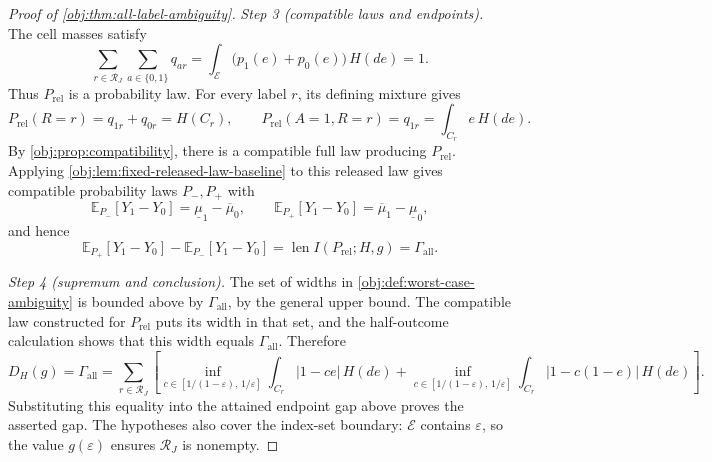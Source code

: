 \documentclass[11pt]{article}
\begin{document}
\begin{proof}[Proof of \cref{obj:thm:all-label-ambiguity}]
\textit{Step 3 (compatible laws and endpoints).}
The cell masses satisfy
\[
\sum_{r\in\mathcal R_J}\sum_{a\in\{0,1\}}q_{ar}
=\int_{\mathcal E}\bigl(p_1(e)+p_0(e)\bigr)\,H(de)=1.
\]
Thus \(P_{\mathrm{rel}}\) is a probability law. For every label \(r\), its defining mixture gives
\[
P_{\mathrm{rel}}(R=r)=q_{1r}+q_{0r}=H(C_r),
\qquad
P_{\mathrm{rel}}(A=1,R=r)=q_{1r}
=\int_{C_r}e\,H(de).
\]
By \cref{obj:prop:compatibility}, there is a compatible full law producing \(P_{\mathrm{rel}}\). Applying \cref{obj:lem:fixed-released-law-baseline} to this released law gives compatible probability laws \(P_-,P_+\) with
\[
\mathbb E_{P_-}[Y_1-Y_0]=\underline\mu_1-\overline\mu_0,
\qquad
\mathbb E_{P_+}[Y_1-Y_0]=\overline\mu_1-\underline\mu_0,
\]
and hence
\[
\mathbb E_{P_+}[Y_1-Y_0]-\mathbb E_{P_-}[Y_1-Y_0]
=\operatorname{len}I(P_{\mathrm{rel}};H,g)
=\Gamma_{\mathrm{all}}.
\]

\textit{Step 4 (supremum and conclusion).}
The set of widths in \cref{obj:def:worst-case-ambiguity} is bounded above by \(\Gamma_{\mathrm{all}}\), by the general upper bound. The compatible law constructed for \(P_{\mathrm{rel}}\) puts its width in that set, and the half-outcome calculation shows that this width equals \(\Gamma_{\mathrm{all}}\). Therefore
\[
D_H(g)=\Gamma_{\mathrm{all}}
=\sum_{r\in\mathcal R_J}\left[
\inf_{c\in[1/(1-\varepsilon),\,1/\varepsilon]}
 \int_{C_r}|1-ce|\,H(de)
+
\inf_{c\in[1/(1-\varepsilon),\,1/\varepsilon]}
 \int_{C_r}|1-c(1-e)|\,H(de)
\right].
\]
Substituting this equality into the attained endpoint gap above proves the asserted gap. The hypotheses also cover the index-set boundary: \(\mathcal E\) contains \(\varepsilon\), so the value \(g(\varepsilon)\) ensures \(\mathcal R_J\) is nonempty.
\end{proof}
\end{document}
